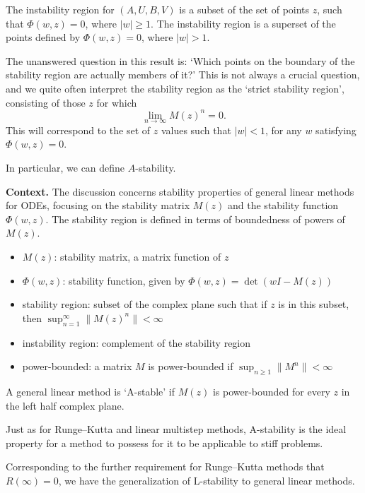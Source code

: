 \begin{theorem}

  \label{thm:520D}
The instability region for $(A, U, B, V)$ is a subset of the set of points $z$, such that $\Phi(w, z) = 0$, where $|w| \geq 1$. The instability region is a superset of the points defined by $\Phi(w, z) = 0$, where $|w| > 1$.

The unanswered question in this result is: `Which points on the boundary of the stability region are actually members of it?' This is not always a crucial question, and we quite often interpret the stability region as the `strict stability region', consisting of those $z$ for which
\[
\lim_{n \to \infty} M(z)^n = 0.
\]
This will correspond to the set of $z$ values such that $|w| < 1$, for any $w$ satisfying $\Phi(w, z) = 0$.

In particular, we can define $A$-stability.
\end{theorem}

\noindent\textbf{Context.}
The discussion concerns stability properties of general linear methods for ODEs, focusing on the stability matrix \(M(z)\) and the stability function \(\Phi(w,z)\). The stability region is defined in terms of boundedness of powers of \(M(z)\).

\begin{itemize}
    \item \(M(z)\): stability matrix, a matrix function of \(z\)
    \item \(\Phi(w, z)\): stability function, given by \(\Phi(w, z) = \det(wI - M(z))\)
    \item stability region: subset of the complex plane such that if \(z\) is in this subset, then \(\sup_{n=1}^{\infty} \|M(z)^n\| < \infty\)
    \item instability region: complement of the stability region
    \item power-bounded: a matrix \(M\) is power-bounded if \(\sup_{n \geq 1} \|M^n\| < \infty\)
\end{itemize}

\begin{definition}[A-stable (520E)]

  \label{def:520E}
A general linear method is `A-stable' if $M(z)$ is power-bounded for every $z$ in the left half complex plane.

Just as for Runge--Kutta and linear multistep methods, A-stability is the ideal property for a method to possess for it to be applicable to stiff problems.

Corresponding to the further requirement for Runge--Kutta methods that $R(\infty) = 0$, we have the generalization of L-stability to general linear methods.
\end{definition}

